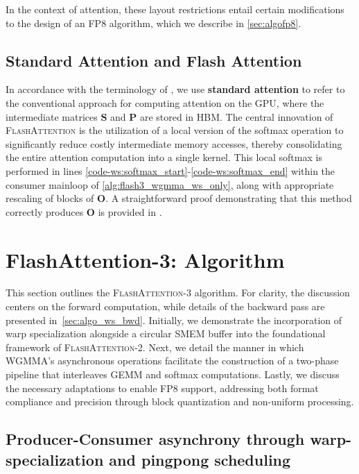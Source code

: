 In the context of attention, these layout restrictions entail certain modifications to the design of an FP8 algorithm, which we describe in \cref{sec:algofp8}.

\subsection{Standard Attention and Flash Attention} In accordance with the terminology of \citet{dao2022flashattention}, we use \textbf{standard attention} to refer to the conventional approach for computing attention on the GPU, where the intermediate matrices $\mathbf{S}$ and $\mathbf{P}$ are stored in HBM. The central innovation of \textsc{FlashAttention} is the utilization of a local version of the softmax operation to significantly reduce costly intermediate memory accesses, thereby consolidating the entire attention computation into a single kernel. This local softmax is performed in lines \ref{code-ws:softmax_start}-\ref{code-ws:softmax_end} within the consumer mainloop of \cref{alg:flash3_wgmma_ws_only}, along with appropriate rescaling of blocks of $\mathbf{O}$. A straightforward proof demonstrating that this method correctly produces $\mathbf{O}$ is provided in \cite[\S 2.3.1]{dao2023flashattention2}.

\section{FlashAttention-3: Algorithm}
\label{sec:algo}

This section outlines the \textsc{FlashAttention-3} algorithm. For clarity, the discussion centers on the forward computation, while details of the backward pass are presented in~\cref{sec:algo_ws_bwd}. Initially, we demonstrate the incorporation of warp specialization alongside a circular SMEM buffer into the foundational framework of \textsc{FlashAttention-2}. Next, we detail the manner in which WGMMA's asynchronous operations facilitate the construction of a two-phase pipeline that interleaves GEMM and softmax computations. Lastly, we discuss the necessary adaptations to enable FP8 support, addressing both format compliance and precision through block quantization and non-uniform processing.

\subsection{Producer-Consumer asynchrony through warp-specialization and pingpong scheduling}
\label{sec:algo_ws}

